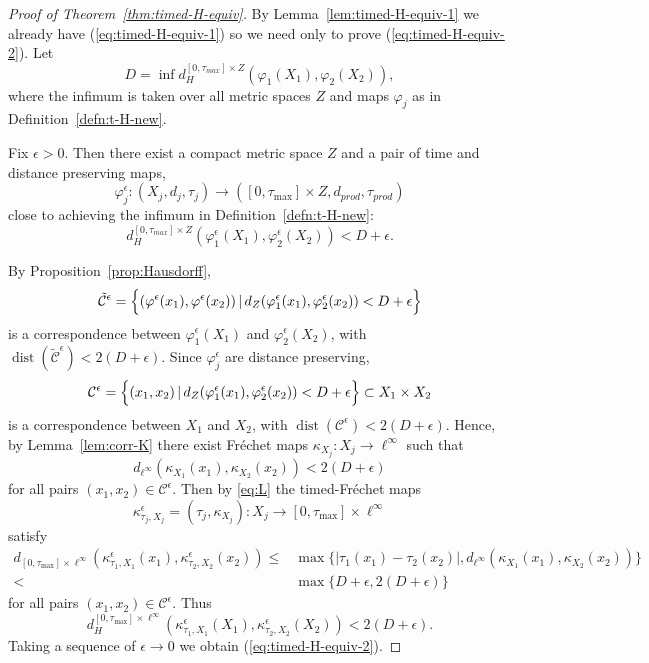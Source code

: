 \documentclass[a4paper,12pt,reqno]{amsart}
\theoremstyle{plain}
\newcommand{\be}{\begin{equation}}
\newcommand{\ee}{\end{equation}}
\newcommand{\dist}{\operatorname{dist}}
\begin{document}
\begin{proof}[Proof of Theorem~\ref{thm:timed-H-equiv}]
By Lemma~\ref{lem:timed-H-equiv-1}
we already have (\ref{eq:timed-H-equiv-1})
so we need only to prove
(\ref{eq:timed-H-equiv-2}).
Let
\be\label{eq:D}
D=\inf d_H^{[0,\tau_{max}]\times Z}(\varphi_1(X_1),\varphi_2(X_2)),
\ee
where the infimum is taken over all metric spaces $Z$ and maps $\varphi_j$ as in 
Definition~\ref{defn:t-H-new}.

Fix $\epsilon>0$. Then there exist a compact metric space $Z$ and a pair of time and distance preserving maps,
\be
\varphi^\epsilon_j:(X_j,d_j,\tau_j)\to
([0,\tau_{\max}]\times Z, d_{prod}, \tau_{prod})
\ee
 close to achieving the infimum in
Definition~\ref{defn:t-H-new}:
\be\label{eq-HausEst}
d_H^{[0,\tau_{max}]\times Z}(\varphi^\epsilon_1(X_1),\varphi^\epsilon_2(X_2))
<D
+\epsilon.
\ee

By Proposition~\ref{prop:Hausdorff},
\be
\tilde {\mathcal C}^\epsilon =
\Bigl\{
(\varphi^\epsilon(x_1),\varphi^\epsilon(x_2)) 
 \,|\, d_{Z}(\varphi^\epsilon_1(x_1),
\varphi^\epsilon_2(x_2))<D+\epsilon  \Bigr\}
\ee
is a correspondence between $\varphi_1^\epsilon(X_1)$ and $\varphi_2^\epsilon(X_2)$, with $\dist( \tilde {\mathcal C}^\epsilon) < 2(D+\epsilon)$.
Since $\varphi^\epsilon_j$ are distance preserving, 
\be
{\mathcal C}^\epsilon =
\Bigl\{
(x_1,x_2) 
 \,|\, d_{Z}(\varphi^\epsilon_1(x_1),
\varphi^\epsilon_2(x_2))<D+\epsilon  \Bigr\} \subset X_1 \times X_2 
\ee
is a correspondence between $X_1$ and $X_2$, with $\dist(\mathcal C^\epsilon) < 2(D+\epsilon)$. Hence, by
Lemma~\ref{lem:corr-K} 
there exist
Fr\'echet maps $\kappa_{X_j}: X_j \to \ell^\infty$ such that 
\be \label{eq:L}
d_{\ell^\infty}(\kappa_{X_1}(x_1),\kappa_{X_2}(x_2)) <2(D+\epsilon) 
\ee
for all pairs $(x_1,x_2)\in \mathcal{C}^\epsilon$.
Then by \eqref{eq:L} the timed-Fr\'echet maps
\be
\kappa^\epsilon_{\tau_j,X_j}=
(\tau_j,\kappa_{X_j}): X_j \to [0, \tau_{\max} ] \times \ell^\infty
\ee
satisfy 
\begin{align*}
d_{[0, \tau_{\max}] \times \ell^\infty}(\kappa^\epsilon_{\tau_1, X_1}(x_1),\kappa^\epsilon_{\tau_2, X_2}(x_2)) \leq & \max\{ 
|\tau_1(x_1)- \tau_2(x_2)|,
d_{\ell^\infty}(\kappa_{X_1}(x_1),\kappa_{X_2}(x_2))\} \\
< & \max\{D+\epsilon, 2(D+\epsilon) \}
\end{align*}
for all pairs $(x_1,x_2)\in \mathcal{C}^\epsilon$.
Thus
\be\label{eq:2D}
d_H^{[0, \tau_{\max}] \times \ell^\infty}(\kappa^\epsilon_{\tau_1,X_1}(X_1),
\kappa^\epsilon_{\tau_2,X_2}(X_2))<2(D+\epsilon).
\ee
Taking a sequence of $\epsilon \to 0$ 
we obtain (\ref{eq:timed-H-equiv-2}).
\end{proof}
\end{document}
